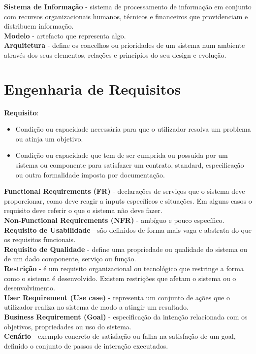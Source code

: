 \documentclass[12pt]{article}
\begin{document}
\vspace{6pt}
\textbf{Sistema de Informação} - sistema de processamento de informação em conjunto com recursos organizacionais humanos, técnicos e financeiros que providenciam e distribuem informação.
\\[6pt]
\textbf{Modelo} - artefacto que representa algo.
\\[6pt]
\textbf{Arquitetura} - define os concelhos ou prioridades de um sistema num ambiente através dos seus elementos, relações e princípios do seu design e evolução.

\newpage

\section{Engenharia de Requisitos}

\textbf{Requisito}:
\begin{itemize}[topsep=0pt, itemsep=0pt]
    \item Condição ou capacidade necessária para que o utilizador resolva um problema ou atinja um objetivo.
    \item Condição ou capacidade que tem de ser cumprida ou possuída por um sistema ou componente para satisfazer um contrato, standard, especificação ou outra formalidade imposta por documentação.
\end{itemize}
\vspace{6pt}
\textbf{Functional Requirements (FR)} - declarações de serviços que o sistema deve proporcionar, como deve reagir a inputs específicos e situações. Em alguns casos o requisito deve referir o que o sistema não deve fazer.
\\[6pt]
\textbf{Non-Functional Requirements (NFR)} - ambíguo e pouco específico.
\\[6pt]
\textbf{Requisito de Usabilidade} - são definidos de forma mais vaga e abstrata do que os requisitos funcionais.
\\[6pt]
\textbf{Requisito de Qualidade} - define uma propriedade ou qualidade do sistema ou de um dado componente, serviço ou função.
\\[6pt]
\textbf{Restrição} - é um requisito organizacional ou tecnológico que restringe a forma como o sistema é desenvolvido. Existem restrições que afetam o sistema ou o desenvolvimento.
\\[6pt]
\textbf{User Requirement (Use case)} - representa um conjunto de ações que o utilizador realiza no sistema de modo a atingir um resultado.
\\[6pt]
\textbf{Business Requirement (Goal)} - especificação da intenção relacionada com os objetivos, propriedades ou uso do sistema.
\\[6pt]
\textbf{Cenário} - exemplo concreto de satisfação ou falha na satisfação de um goal, definido o conjunto de passos de interação executados.
\end{document}
